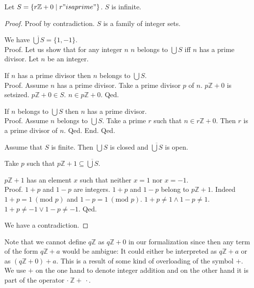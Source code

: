\documentclass{article}
\renewcommand{\mod}{\text{mod }}
\newcommand{\Int}{\mathbb{Z}}
\begin{document}
  \begin{forthel}
    \begin{theorem}[Fuerstenberg]
      Let $S = \{ r \Int + 0 \mid r "is a prime" \}$. $S$ is infinite.
    \end{theorem}
    \begin{proof}
      Proof by contradiction. $S$ is a family of integer sets.

      We have $\overline{\bigcup S} = \{ 1, -1 \}$. \\
      Proof.
        Let us show that for any integer $n$ $n$ belongs to $\bigcup S$ iff $n$ has a prime divisor.
          Let $n$ be an integer.

          If $n$ has a prime divisor then $n$ belongs to $\bigcup S$. \\
          Proof.
            Assume $n$ has a prime divisor. Take a prime divisor $p$ of $n$. $p \Int + 0$ is setsized. $p \Int + 0 \in S$. $n \in p \Int + 0$.
          Qed.

          If $n$ belongs to $\bigcup S$ then $n$ has a prime divisor. \\
          Proof.
            Assume $n$ belongs to $\bigcup S$. Take a prime $r$ such that $n \in r \Int + 0$. Then $r$ is a prime divisor of $n$.
          Qed.
        End.
      Qed.

      Assume that $S$ is finite. Then $\bigcup S$ is closed and $\overline{\bigcup S}$ is open.

      Take $p$ such that $p \Int + 1 \subseteq \overline{\bigcup S}$.

      $p \Int + 1$ has an element $x$ such that neither $x = 1$ nor $x = -1$. \\
      Proof.
        $1 + p$ and $1 - p$ are integers. $1 + p$ and $1 - p$ belong to $p \Int + 1$. Indeed $1 + p = 1 ~(\mod p)$ and $1 - p = 1 ~(\mod p)$. $1 + p \neq  1 \wedge 1 - p \neq  1$. $1 + p \neq -1 \vee 1 - p \neq -1$.
      Qed.

      We have a contradiction.
    \end{proof}
  \end{forthel}

  Note that we cannot define $q \Int$ as $q \Int + 0$ in our formalization since then any term of the form $q \Int + a$ would be ambigue: It could either be interpreted as $q \Int + a$ or as $(q \Int + 0) + a$. This is a result of some kind of overloading of the symbol $+$. We use $+$ on the one hand to denote integer addition and on the other hand it is part of the operator $\cdot ~ \Int + ~ \cdot$.

  \vfill\doclicenseThis
\end{document}
